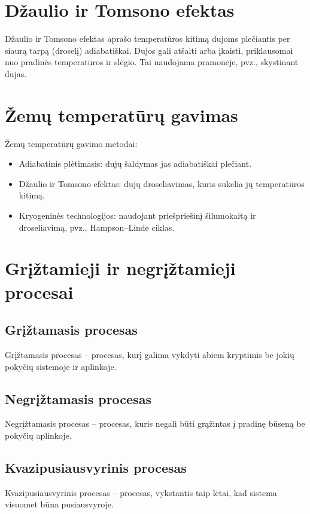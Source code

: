 \documentclass[a4paper,12pt]{article}
\begin{document}
\section{Džaulio ir Tomsono efektas}

Džaulio ir Tomsono efektas aprašo temperatūros kitimą dujoms plečiantis per siaurą tarpą (droselį) adiabatiškai. Dujos gali atšalti arba įkaisti, priklausomai nuo pradinės temperatūros ir slėgio. Tai naudojama pramonėje, pvz., skystinant dujas.

\section{Žemų temperatūrų gavimas}

Žemų temperatūrų gavimo metodai:
\begin{itemize}
    \item Adiabatinis plėtimasis: dujų šaldymas jas adiabatiškai plečiant.
    \item Džaulio ir Tomsono efektas: dujų droseliavimas, kuris sukelia jų temperatūros kitimą.
    \item Kryogeninės technologijos: naudojant priešpriešinį šilumokaitą ir droseliavimą, pvz., Hampson–Linde ciklas.
\end{itemize}

\section{Grįžtamieji ir negrįžtamieji procesai}

\subsection{Grįžtamasis procesas}
Grįžtamasis procesas – procesas, kurį galima vykdyti abiem kryptimis be jokių pokyčių sistemoje ir aplinkoje.

\subsection{Negrįžtamasis procesas}
Negrįžtamasis procesas – procesas, kuris negali būti grąžintas į pradinę būseną be pokyčių aplinkoje.

\subsection{Kvazipusiausvyrinis procesas}
Kvazipusiausvyrinis procesas – procesas, vykstantis taip lėtai, kad sistema visuomet būna pusiausvyroje.
\end{document}
